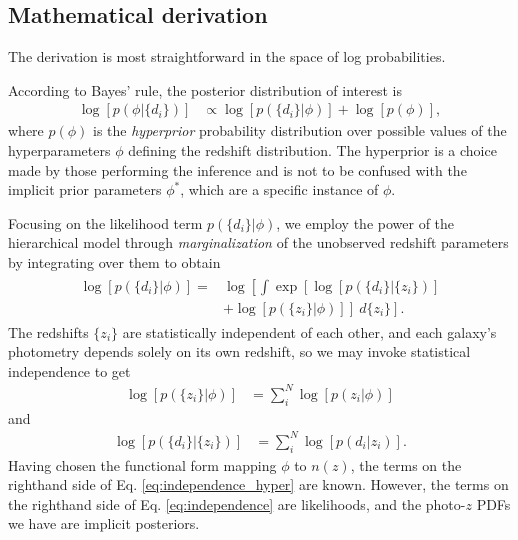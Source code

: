 \documentclass[iop]{emulateapj}
\begin{document}
\begin{appendices}

\section{Mathematical derivation}
\label{app:math}

The derivation is most straightforward in the space of log probabilities.

According to Bayes' rule, the posterior distribution of interest is
\begin{align}
\label{eq:hyper_bayes}
\log[p(\phi | \{d_{i}\})] &\propto \log[p(\{d_{i}\} | \phi)] + \log[p(\phi)] ,
\end{align}
where $p(\phi)$ is the \textit{hyperprior} probability distribution over possible values of the hyperparameters $\phi$ defining the redshift distribution.  
The hyperprior is a choice made by those performing the inference and is not to be confused with the implicit prior parameters $\phi^{*}$, which are a specific instance of $\phi$.

Focusing on the likelihood term $p(\{d_{i}\} | \phi)$, we employ the power of the hierarchical model through \textit{marginalization} of the unobserved redshift parameters by integrating over them to obtain 
\begin{align}
\label{eq:marginalize}
\begin{split}
\log[p(\{d_{i}\} | \phi)] = & \log\left[\int\exp\left[\log[p(\{d_{i}\} | \{z_{i}\})]\right.\right. \\
& \left.\left.+ \log[p(\{z_{i}\} | \phi)]\right]\ d\{z_{i}\}\right] .
\end{split}
\end{align}
The redshifts $\{z_{i}\}$ are statistically independent of each other, and each galaxy's photometry depends solely on its own redshift, so we may invoke statistical independence to get
\begin{align}
\label{eq:independence_hyper}
\log[p(\{z_{i}\} |\phi)] &= \sum_{i}^{N} \log[p(z_{i} | \phi)]
\end{align}
and
\begin{align}
\label{eq:independence}
\log[p(\{d_{i}\} | \{z_{i}\})] &= \sum_{i}^{N} \log[p(d_{i} | z_{i})] .
\end{align}
Having chosen the functional form mapping $\phi$ to $n(z)$, the terms on the righthand side of Eq. \ref{eq:independence_hyper} are known.  
However, the terms on the righthand side of Eq. \ref{eq:independence} are likelihoods, and the photo-$z$ PDFs we have are implicit posteriors.


\end{appendices}
\end{document}

